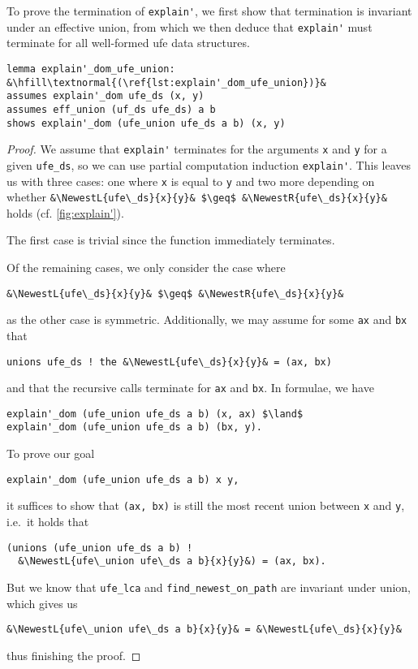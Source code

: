 \documentclass[
  sigplan,
  10pt,
  anonymous,
  review,
  ]{acmart}
\newcommand{\NewestL}[3]{(#2 $\upharpoonleft$ #3)$_\text{#1}$}
\newcommand{\NewestR}[3]{(#2 $\upharpoonright$ #3)$_\text{#1}$}
\begin{document}
To prove the termination of \lstinline|explain'|, we first show that termination is invariant under an effective union, from which we then deduce that \lstinline|explain'| must terminate for all well-formed \acrshort{ufe} data structures.
\begin{lstlisting}[caption={[empty]}, label={lst:explain'_dom_ufe_union}]
lemma explain'_dom_ufe_union: &\hfill\textnormal{(\ref{lst:explain'_dom_ufe_union})}&
assumes explain'_dom ufe_ds (x, y)
assumes eff_union (uf_ds ufe_ds) a b
shows explain'_dom (ufe_union ufe_ds a b) (x, y)
\end{lstlisting}
\begin{proof}
  We assume that \lstinline|explain'| terminates for the arguments \lstinline|x| and \lstinline|y| for a given \lstinline|ufe_ds|, so we can use partial computation induction \lstinline|explain'|.
  This leaves us with three cases: one where \lstinline|x| is equal to \lstinline|y| and two more depending on whether \lstinline|&\NewestL{ufe\_ds}{x}{y}& $\geq$ &\NewestR{ufe\_ds}{x}{y}&| holds (cf. \autoref{fig:explain'}).

  The first case is trivial since the function immediately terminates.

  Of the remaining cases, we only consider the case where
  \begin{lstlisting}
&\NewestL{ufe\_ds}{x}{y}& $\geq$ &\NewestR{ufe\_ds}{x}{y}& 
  \end{lstlisting}
  as the other case is symmetric.
  Additionally, we may assume for some \lstinline|ax| and \lstinline|bx| that
  \begin{lstlisting}
unions ufe_ds ! the &\NewestL{ufe\_ds}{x}{y}& = (ax, bx)
  \end{lstlisting}
  and that the recursive calls terminate for \lstinline|ax| and \lstinline|bx|.
  In formulae, we have
  \begin{lstlisting}
explain'_dom (ufe_union ufe_ds a b) (x, ax) $\land$
explain'_dom (ufe_union ufe_ds a b) (bx, y).
  \end{lstlisting}
  To prove our goal
  \begin{lstlisting}
explain'_dom (ufe_union ufe_ds a b) x y,
  \end{lstlisting}
it suffices to show that \lstinline|(ax, bx)| is still the most recent union between \lstinline|x| and \lstinline|y|, i.e.\ it holds that 
  \begin{lstlisting}
(unions (ufe_union ufe_ds a b) !
  &\NewestL{ufe\_union ufe\_ds a b}{x}{y}&) = (ax, bx).
  \end{lstlisting}
  But we know that \lstinline|ufe_lca| and \lstinline|find_newest_on_path| are invariant under union, which gives us
  \begin{lstlisting}
&\NewestL{ufe\_union ufe\_ds a b}{x}{y}& = &\NewestL{ufe\_ds}{x}{y}&
  \end{lstlisting}
  thus finishing the proof.
\end{proof}
\end{document}
